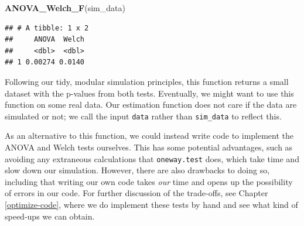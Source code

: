 \documentclass[
]{book}
\newenvironment{Shaded}{\begin{snugshade}}{\end{snugshade}}
\newcommand{\AttributeTok}[1]{\textcolor[rgb]{0.13,0.29,0.53}{#1}}
\newcommand{\ConstantTok}[1]{\textcolor[rgb]{0.56,0.35,0.01}{#1}}
\newcommand{\ControlFlowTok}[1]{\textcolor[rgb]{0.13,0.29,0.53}{\textbf{#1}}}
\newcommand{\FunctionTok}[1]{\textcolor[rgb]{0.13,0.29,0.53}{\textbf{#1}}}
\newcommand{\NormalTok}[1]{#1}
\newcommand{\OtherTok}[1]{\textcolor[rgb]{0.56,0.35,0.01}{#1}}
\newcommand{\SpecialCharTok}[1]{\textcolor[rgb]{0.81,0.36,0.00}{\textbf{#1}}}
\begin{document}
\begin{Shaded}
\end{Shaded}

\begin{Shaded}
\begin{Highlighting}[]
\FunctionTok{ANOVA\_Welch\_F}\NormalTok{(sim\_data)}
\end{Highlighting}
\end{Shaded}

\begin{verbatim}
## # A tibble: 1 x 2
##     ANOVA  Welch
##     <dbl>  <dbl>
## 1 0.00274 0.0140
\end{verbatim}

Following our tidy, modular simulation principles, this function returns a small dataset with the p-values from both tests.
Eventually, we might want to use this function on some real data.
Our estimation function does not care if the data are simulated or not; we call the input \texttt{data} rather than \texttt{sim\_data} to reflect this.

As an alternative to this function, we could instead write code to implement the ANOVA and Welch tests ourselves.
This has some potential advantages, such as avoiding any extraneous calculations that \texttt{oneway.test} does, which take time and slow down our simulation.
However, there are also drawbacks to doing so, including that writing our own code takes \emph{our} time and opens up the possibility of errors in our code.
For further discussion of the trade-offs, see Chapter \ref{optimize-code}, where we do implement these tests by hand and see what kind of speed-ups we can obtain.
\end{document}
